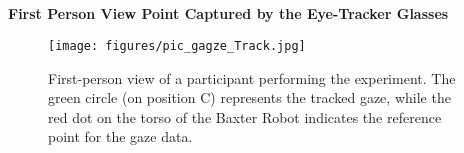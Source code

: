 \subsection*{}
\textbf{First Person View Point Captured by the Eye-Tracker Glasses}
\begin{figure}[H]
    \centering
    \texttt{[image: figures/pic\_gagze\_Track.jpg]}
    \caption{First-person view of a participant performing the experiment. The green circle (on position C) represents the tracked gaze, while the red dot on the torso of the Baxter Robot indicates the reference point for the gaze data.}
    \label{fig:gaze_tracking_POV}
\end{figure}
